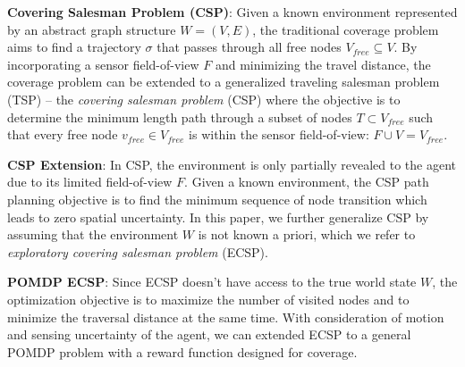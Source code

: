 \documentclass{article}
\newcommand{\ph}[1]{{\textbf{#1}:}} %
\newcommand{\gautam}[1]{{\color{cyan}Gautam: #1 }}
\begin{document}

\ph{Covering Salesman Problem (CSP)} Given a known environment represented by an abstract graph structure $W = (V, E)$, the traditional coverage problem aims to find a trajectory $\sigma$ that passes through all free nodes $V_{free} \subseteq V$. By  incorporating a sensor field-of-view $F$ and minimizing the travel distance, the coverage problem can be extended to a generalized traveling salesman problem (TSP) -- the \emph{covering salesman problem} (CSP) where the objective is to determine the minimum length path through a subset of nodes $T \subset V_{free}$ such that every free node $v_{free} \in V_{free}$ is within the sensor field-of-view: $F \cup V = V_{free}$.

\ph{CSP Extension} In CSP, the environment is only partially revealed to the agent due to its limited field-of-view $F$. Given a known environment, the CSP path planning objective is to find the minimum sequence of node transition which leads to zero spatial uncertainty. In this paper, we further generalize CSP by assuming that the environment $W$ is not known a priori, which we refer to \emph{exploratory covering salesman problem} (ECSP).

\ph{POMDP ECSP} Since ECSP doesn't have access to the true world state $W$, the optimization objective is to maximize the number of visited nodes and to minimize the traversal distance at the same time. With consideration of motion and sensing uncertainty of the agent, we can extended ECSP to a general POMDP problem with a reward function designed for coverage.

\end{document}
